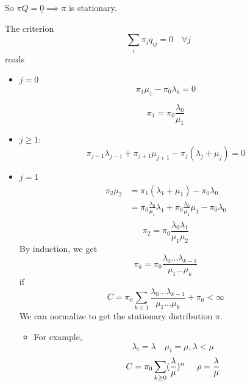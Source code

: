 \documentclass{article}
\begin{document}
So $\pi Q = \underline{0} \implies \pi$ is stationary.
\begin{example}
	The criterion 
	\begin{equation*}
		\sum_i \pi_i q_{ij} = 0 \quad \forall j
	\end{equation*}
	reads %
	\begin{itemize}
		\item $j=0$
		\begin{equation*}
			\pi_1 \mu_1 - \pi_0 \lambda_0 = 0
		\end{equation*}
		
		\begin{equation*}
			\pi_1 = \pi_0 \frac{\lambda_0}{\mu_1}
		\end{equation*}
		\item $ j \geq 1$:
		\begin{equation*}
			\pi_{j-1} \lambda_{j-1} + \pi_{j+1} \mu_{j+1} - \pi_j(\lambda_j + \mu_j) = 0
		\end{equation*}
		\item $j = 1$
		\begin{align*}
			\pi_2 \mu_2 &= \pi_1(\lambda_1 + \mu_1) - \pi_0 \lambda_0 \\
			&= \pi_0 \frac{\lambda_0}{\mu_1} \lambda_1 + \pi_0\frac{\lambda_0}{\mu_1}\mu_1 - \pi_0 \lambda_0 \\
		\end{align*}
		\begin{equation*}
			\pi_2 = \pi_0 \frac{\lambda_0 \lambda_1}{\mu_1 \mu_2}
		\end{equation*}
		By induction, we get 
		\begin{equation*}
			\pi_k = \pi_0 \frac{\lambda_0 \ldots \lambda_{k-1}}{\mu_1 \ldots \mu_k}
		\end{equation*}
		if 
		\begin{equation*}
			C= \pi_0 \sum_{k \geq 1} \frac{\lambda_0 \ldots \lambda_{k-1}}{\mu_1 \ldots \mu_k} + \pi_0 < \infty
		\end{equation*}
		We can normalize to get the stationary distribution $\pi$. \\
		\begin{itemize}
			\item For example, 
			\begin{equation*}
				\lambda_i = \lambda \quad \mu_i = \mu, \lambda < \mu
			\end{equation*}
			\begin{align*}
				C &= \pi_0 \sum_{k \geq 0} (\frac{\lambda}{\mu})^n \hspace{0.5 cm} \rho = \frac{\lambda}{\mu} \\

\end{align*}
\end{itemize}
\end{itemize}
\end{example}
\end{document}
